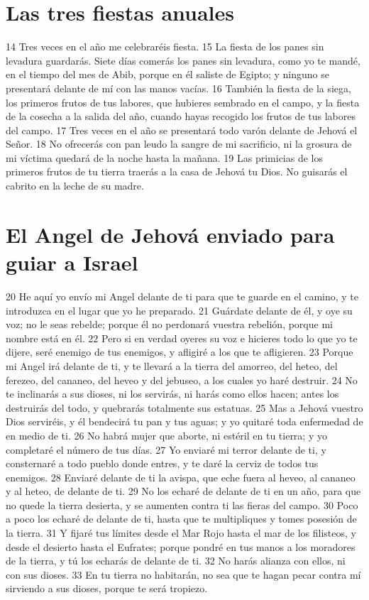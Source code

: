 \section*{Las tres fiestas anuales}

14 Tres veces en el año me celebraréis fiesta.
15 La fiesta de los panes sin levadura guardarás. Siete días comerás los panes sin levadura, como yo te mandé, en el tiempo del mes de Abib, porque en él saliste de Egipto; y ninguno se presentará delante de mí con las manos vacías.
16 También la fiesta de la siega, los primeros frutos de tus labores, que hubieres sembrado en el campo, y la fiesta de la cosecha a la salida del año, cuando hayas recogido los frutos de tus labores del campo.
17 Tres veces en el año se presentará todo varón delante de Jehová el Señor.
18 No ofrecerás con pan leudo la sangre de mi sacrificio, ni la grosura de mi víctima quedará de la noche hasta la mañana.
19 Las primicias de los primeros frutos de tu tierra traerás a la casa de Jehová tu Dios. No guisarás el cabrito en la leche de su madre.

\section*{El Angel de Jehová enviado para guiar a Israel}

20 He aquí yo envío mi Angel delante de ti para que te guarde en el camino, y te introduzca en el lugar que yo he preparado.
21 Guárdate delante de él, y oye su voz; no le seas rebelde; porque él no perdonará vuestra rebelión, porque mi nombre está en él.
22 Pero si en verdad oyeres su voz e hicieres todo lo que yo te dijere, seré enemigo de tus enemigos, y afligiré a los que te afligieren.
23 Porque mi Angel irá delante de ti, y te llevará a la tierra del amorreo, del heteo, del ferezeo, del cananeo, del heveo y del jebuseo, a los cuales yo haré destruir.
24 No te inclinarás a sus dioses, ni los servirás, ni harás como ellos hacen; antes los destruirás del todo, y quebrarás totalmente sus estatuas.
25 Mas a Jehová vuestro Dios serviréis, y él bendecirá tu pan y tus aguas; y yo quitaré toda enfermedad de en medio de ti.
26 No habrá mujer que aborte, ni estéril en tu tierra; y yo completaré el número de tus días.
27 Yo enviaré mi terror delante de ti, y consternaré a todo pueblo donde entres, y te daré la cerviz de todos tus enemigos.
28 Enviaré delante de ti la avispa, que eche fuera al heveo, al cananeo y al heteo, de delante de ti.
29 No los echaré de delante de ti en un año, para que no quede la tierra desierta, y se aumenten contra ti las fieras del campo.
30 Poco a poco los echaré de delante de ti, hasta que te multipliques y tomes posesión de la tierra.
31 Y fijaré tus límites desde el Mar Rojo hasta el mar de los filisteos, y desde el desierto hasta el Eufrates; porque pondré en tus manos a los moradores de la tierra, y tú los echarás de delante de ti.
32 No harás alianza con ellos, ni con sus dioses.
33 En tu tierra no habitarán, no sea que te hagan pecar contra mí sirviendo a sus dioses, porque te será tropiezo.

